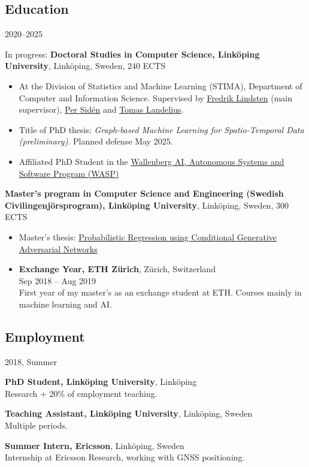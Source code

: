 \documentclass[12pt]{article}
\newcommand{\cvheading}[1]{\subsection*{#1}}
\begin{document}
\cvheading{Education}
\begin{labeling}{2020--2025}
    \item [2020--2025] In progress: \textbf{Doctoral Studies in Computer Science, Linköping University}, Linköping, Sweden, 240 ECTS
        \begin{itemize}
            \item At the Division of Statistics and Machine Learning (STIMA), Department of Computer and Information Science. Supervised by \href{https://lindsten.netlify.app/}{Fredrik Lindsten} (main supervisor), \href{https://scholar.google.se/citations?user=0UomzRIAAAAJ}{Per Sidén} and \href{https://www.smhi.se/en/research/research-departments/meteorology/tomas-landelius-1.4817}{Tomas Landelius}.
            \item Title of PhD thesis: \textit{Graph-based Machine Learning for Spatio-Temporal Data (preliminary)}.
            Planned defense May 2025.
            \item Affiliated PhD Student in the \href{https://wasp-sweden.org/}{Wallenberg AI, Autonomous Systems and Software Program (WASP)}
        \end{itemize}
    \item [2015--2020]
            \textbf{Master's program in Computer Science and Engineering (Swedish Civilingenjörsprogram), Linköping University}, Linköping, Sweden, 300 ECTS
        \begin{itemize}
            \item Master's thesis: \href{http://urn.kb.se/resolve?urn=urn:nbn:se:liu:diva-166637}{Probabilistic Regression using Conditional Generative Adversarial Networks}
            \item \textbf{Exchange Year, ETH Zürich}, Zürich, Switzerland\\
        Sep 2018 -- Aug 2019\\
            First year of my master's as an exchange student at ETH. Courses mainly in machine learning and AI.
        \end{itemize}
\end{labeling}

\cvheading{Employment}
\begin{labeling}{2018, Summer}
    \item [2020 --]\textbf{PhD Student, Linköping University}, Linköping\\
        Research + 20\% of employment teaching.
    \item [2016--2019] \textbf{Teaching Assistant, Linköping University}, Linköping, Sweden\\
        Multiple periods.

    \item [2018, Summer] \textbf{Summer Intern, Ericsson}, Linköping, Sweden\\
        Internship at Ericsson Research, working with GNSS positioning.
\end{labeling}
\end{document}
